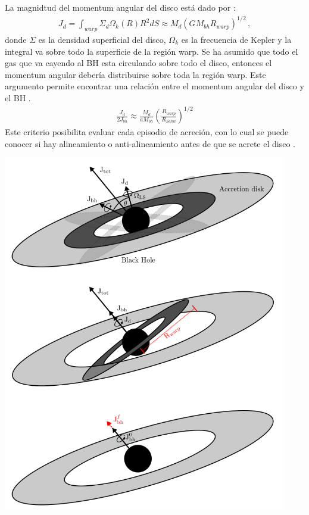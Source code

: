 La magnidtud del momentum angular del disco está dado por \cite{Bustamante2018b}:
%
\begin{align}
    J_{d}=\int_{warp} \Sigma_{d}\Omega_{k}(R)R^{2}dS \approx M_{d}(GM_{bh}R_{warp})^{1/2}\,,
    \label{eq: magnitid J_disco}
\end{align}
%
donde $\Sigma$ es la densidad superficial del disco, $\Omega_{k}$ es la frecuencia de Kepler y la integral va sobre todo la superficie de la región warp. Se ha asumido que todo el gas que va cayendo al BH esta circulando sobre todo el disco, entonces el momentum angular debería distribuirse sobre toda la región warp. Este argumento permite encontrar una relación entre el momentum angular del disco y el BH \cite{king2005}.
%
\begin{align}
    \frac{J_{d}}{2J_{bh}}\approx \frac{M_{d}}{aM_{bh}}\left(\frac{R_{warp}}{R_{Schw}} \right)^{1/2}
\end{align}
%
Este criterio posibilita evaluar cada episodio de acreción, con lo cual se puede conocer si hay alineamiento o anti-alineamiento antes de que se acrete el disco \cite{Bustamante2018b}. 

\begin{center}
\includegraphics[scale=.5]{./figures/4_Modelo_Spin/evolucion_spin.png}
\label{fig: evolucion espin}
\end{center}


